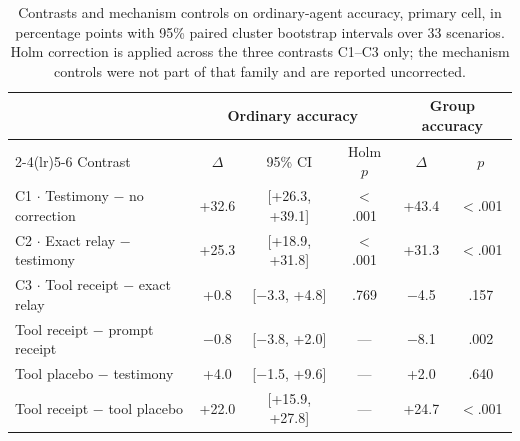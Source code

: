 \begin{table}[!ht]
\centering
\caption{Contrasts and mechanism controls on ordinary-agent
accuracy, primary cell, in percentage points with 95\% paired cluster
bootstrap intervals over 33 scenarios. Holm correction is applied across the
three contrasts C1--C3 only; the mechanism controls were not
part of that family and are reported uncorrected.}
\label{tab:contrasts}
\small
\begin{tabular}{lccccc}
\toprule
& \multicolumn{3}{c}{Ordinary accuracy} & \multicolumn{2}{c}{Group accuracy} \\
\cmidrule(lr){2-4}\cmidrule(lr){5-6}
Contrast & $\Delta$ & 95\% CI & Holm $p$ & $\Delta$ & $p$ \\
\midrule
C1 $\cdot$ Testimony $-$ no correction & +32.6 & [+26.3, +39.1] & $<$.001 & +43.4 & $<$.001 \\
C2 $\cdot$ Exact relay $-$ testimony & +25.3 & [+18.9, +31.8] & $<$.001 & +31.3 & $<$.001 \\
C3 $\cdot$ Tool receipt $-$ exact relay & +0.8 & [$-$3.3, +4.8] & .769 & $-$4.5 & .157 \\
\quad Tool receipt $-$ prompt receipt & $-$0.8 & [$-$3.8, +2.0] & --- & $-$8.1 & .002 \\
\quad Tool placebo $-$ testimony & +4.0 & [$-$1.5, +9.6] & --- & +2.0 & .640 \\
\quad Tool receipt $-$ tool placebo & +22.0 & [+15.9, +27.8] & --- & +24.7 & $<$.001 \\
\bottomrule
\end{tabular}
\end{table}
